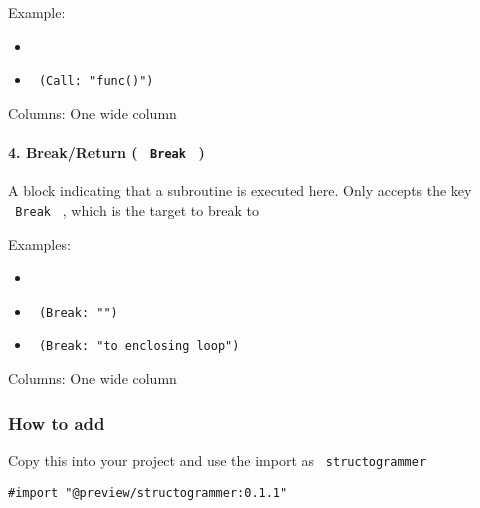 Example:

\begin{itemize}
\tightlist
\item
\item
  \texttt{\ (Call:\ "func()")\ }

  \pandocbounded{}
\end{itemize}

Columns: One wide column

\paragraph{\texorpdfstring{4. Break/Return ( \texttt{\ Break\ }
)}{4. Break/Return (  Break  )}}\label{breakreturn-break}

A block indicating that a subroutine is executed here. Only accepts the
key \texttt{\ Break\ } , which is the target to break to

Examples:

\begin{itemize}
\tightlist
\item
\item
  \texttt{\ (Break:\ "")\ }

  \pandocbounded{}
\item
  \texttt{\ (Break:\ "to\ enclosing\ loop")\ }

  \pandocbounded{}
\end{itemize}

Columns: One wide column

\subsubsection{How to add}\label{how-to-add}

Copy this into your project and use the import as
\texttt{\ structogrammer\ }

\begin{verbatim}
#import "@preview/structogrammer:0.1.1"
\end{verbatim}



